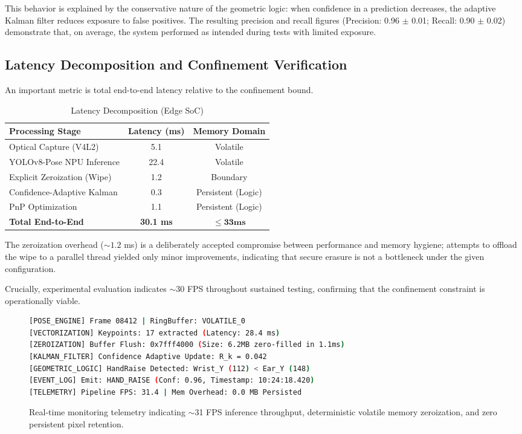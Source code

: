 \documentclass[conference]{IEEEtran}
\begin{document}
This behavior is explained by the conservative nature of the geometric logic: when confidence in a prediction decreases, the adaptive Kalman filter reduces exposure to false positives. The resulting precision and recall figures (Precision: 0.96 $\pm$ 0.01; Recall: 0.90 $\pm$ 0.02) demonstrate that, on average, the system performed as intended during tests with limited exposure.

\subsection{Latency Decomposition and Confinement Verification}
An important metric is total end-to-end latency relative to the confinement bound.

\begin{table}[htbp]
\caption{Latency Decomposition (Edge SoC)}
\begin{center}
\begin{tabular}{lcc}
\toprule
\textbf{Processing Stage} & \textbf{Latency (ms)} & \textbf{Memory Domain} \\
\midrule
Optical Capture (V4L2) & 5.1 & Volatile \\
YOLOv8-Pose NPU Inference & 22.4 & Volatile \\
Explicit Zeroization (Wipe) & 1.2 & Boundary \\
Confidence-Adaptive Kalman & 0.3 & Persistent (Logic) \\
PnP Optimization & 1.1 & Persistent (Logic) \\
\midrule
\textbf{Total End-to-End} & \textbf{30.1 ms} & $\mathbf{\le 33 ms}$ \\
\bottomrule
\end{tabular}
\end{center}
\end{table}

The zeroization overhead ($\sim 1.2$ ms) is a deliberately accepted compromise between performance and memory hygiene; attempts to offload the wipe to a parallel thread yielded only minor improvements, indicating that secure erasure is not a bottleneck under the given configuration.

Crucially, experimental evaluation indicates $\sim$30 FPS throughout sustained testing, confirming that the confinement constraint is operationally viable.

\begin{figure}[htbp]
\begin{lstlisting}[language=bash]
[POSE_ENGINE] Frame 08412 | RingBuffer: VOLATILE_0
[VECTORIZATION] Keypoints: 17 extracted (Latency: 28.4 ms)
[ZEROIZATION] Buffer Flush: 0x7fff4000 (Size: 6.2MB zero-filled in 1.1ms)
[KALMAN_FILTER] Confidence Adaptive Update: R_k = 0.042
[GEOMETRIC_LOGIC] HandRaise Detected: Wrist_Y (112) < Ear_Y (148)
[EVENT_LOG] Emit: HAND_RAISE (Conf: 0.96, Timestamp: 10:24:18.420)
[TELEMETRY] Pipeline FPS: 31.4 | Mem Overhead: 0.0 MB Persisted
\end{lstlisting}
\caption{Real-time monitoring telemetry indicating $\sim$31 FPS inference throughput, deterministic volatile memory zeroization, and zero persistent pixel retention.}
\label{fig:terminal_logs}
\end{figure}
\end{document}
